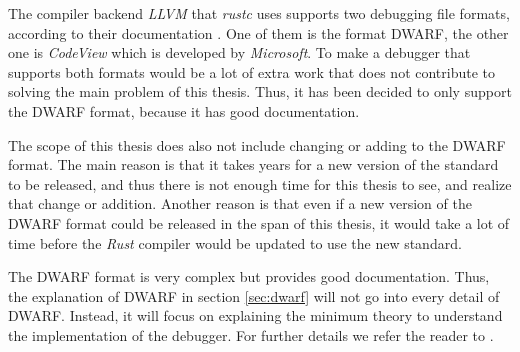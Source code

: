 

The compiler backend \emph{LLVM} that \emph{rustc} uses supports two debugging file formats, according to their documentation \cite{llvm-dbs}.
One of them is the format \gls{DWARF}, the other one is \emph{CodeView} which is developed by \emph{Microsoft}.
To make a debugger that supports both formats would be a lot of extra work that does not contribute to solving the main problem of this thesis.
Thus, it has been decided to only support the \gls{DWARF} format, because it has good documentation.


The scope of this thesis does also not include changing or adding to the \gls{DWARF} format.
The main reason is that it takes years for a new version of the standard to be released, and thus there is not enough time for this thesis to see, and realize that change or addition.
Another reason is that even if a new version of the \gls{DWARF} format could be released in the span of this thesis, it would take a lot of time before the \emph{Rust} compiler would be updated to use the new standard.


The \gls{DWARF} format is very complex but provides good documentation.
Thus, the explanation of \gls{DWARF} in section \ref{sec:dwarf} will not go into every detail of \gls{DWARF}.
Instead, it will focus on explaining the minimum theory to understand the implementation of the debugger.
For further details we refer the reader to \cite{dwarf}.


